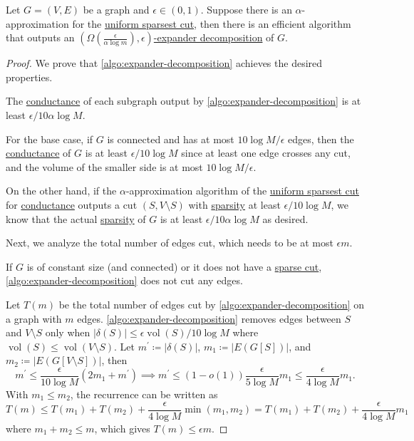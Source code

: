 \begin{theorem}\label{thm:expander-decomposition}
	Let \(G=(V, E)\) be a graph and \(\epsilon \in (0, 1)\). Suppose there is an \(\alpha \)-approximation for the \hyperref[prb:sparsest-cut]{uniform sparsest cut}, then there is an efficient algorithm that outputs an \hyperref[def:expander-decomposition]{\((\Omega (\frac{\epsilon }{\alpha \log m}), \epsilon )\)-expander decomposition} of \(G\).
\end{theorem}
\begin{proof}
	We prove that \autoref{algo:expander-decomposition} achieves the desired properties.

	\begin{claim}
		The \hyperref[def:conductance]{conductance} of each subgraph output by \autoref{algo:expander-decomposition} is at least \(\epsilon / 10 \alpha \log M\).
	\end{claim}
	\begin{explanation}
		For the base case, if \(G\) is connected and has at most \(10 \log M / \epsilon \) edges, then the \hyperref[def:conductance]{conductance} of \(G\) is at least \(\epsilon / 10 \log M\) since at least one edge crosses any cut, and the volume of the smaller side is at most \(10 \log M / \epsilon \).

		On the other hand, if the \(\alpha \)-approximation algorithm of the \hyperref[prb:sparsest-cut]{uniform sparsest cut} for \hyperref[def:conductance]{conductance} outputs a cut \((S, V\setminus S)\) with \hyperref[def:sparsity]{sparsity} at least \(\epsilon / 10\log M\), we know that the actual \hyperref[def:sparsity]{sparsity} of \(G\) is at least \(\epsilon / 10 \alpha \log M\) as desired.
	\end{explanation}

	Next, we analyze the total number of edges cut, which needs to be at most \(\epsilon m\).
	\begin{intuition}
		If \(G\) is of constant size (and connected) or it does not have a \hyperref[prb:sparsest-cut]{sparse cut}, \autoref{algo:expander-decomposition} does not cut any edges.
	\end{intuition}
	Let \(T(m)\) be the total number of edges cut by \autoref{algo:expander-decomposition} on a graph with \(m\) edges. \autoref{algo:expander-decomposition} removes edges between \(S\) and \(V\setminus S\) only when \(\lvert \delta (S) \rvert \leq \epsilon \operatorname{vol}(S) / 10 \log M \) where \(\operatorname{vol}(S) \leq \operatorname{vol}(V \setminus S) \). Let \(m^{\prime} \coloneqq \lvert \delta (S) \rvert \), \(m_1 \coloneqq \lvert E(G[S]) \rvert \), and \(m_2 \coloneqq \lvert E(G[V\setminus S]) \rvert\), then
	\[
		m^{\prime}
		\leq \frac{\epsilon }{10 \log M} (2m_1 + m^{\prime} )
		\implies m^{\prime} \leq (1 - o(1)) \frac{\epsilon }{5 \log M} m_1
		\leq \frac{\epsilon }{4 \log M} m_1.
	\]
	With \(m_1 \leq m_2\), the recurrence can be written as
	\[
		T(m)
		\leq T(m_1) + T(m_2) + \frac{\epsilon }{4 \log M} \min (m_1, m_2)
		= T(m_1) + T(m_2) + \frac{\epsilon }{4 \log M} m_1
	\]
	where \(m_1 + m_2 \leq m\), which gives \(T(m) \leq \epsilon m\).
\end{proof}

